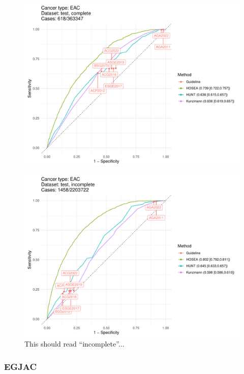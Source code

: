 \documentclass[12pt]{article}
\begin{document}
\begin{figure}[ht]
\includegraphics[width=1.0\linewidth]{comparison/EAC_complete.pdf}
\end{figure}

\begin{figure}[ht]
\includegraphics[width=1.0\linewidth]{comparison/EAC_incomplete.pdf}
\caption{This should read ``incomplete''...}
\end{figure}

\clearpage
\newpage
\subsubsection{EGJAC}
\end{document}
